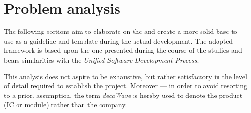 \chapter{Problem analysis}\label{ch:analysis}

The following sections aim to elaborate on the  and create a more solid base to use as a guideline and template during the actual development.
The adopted framework is based upon the one presented during the course of the studies \cite{up} and bears similarities with the \emph{Unified Software Development Process}.

This analysis does not aspire to be exhaustive, but rather satisfactory in the level of detail required to establish the project.
Moreover --- in order to avoid resorting to a priori assumption, the term \emph{decaWave} is hereby used to denote the product (IC or module) rather than the company.









